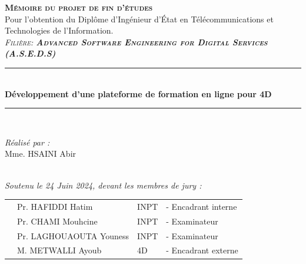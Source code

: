 \vspace{0.5cm}
\begin{center}
{\large \textsc{\textbf{Mémoire du projet de fin d'études}}}\\[0.1cm]
{\large {Pour l’obtention du Diplôme d’Ingénieur d’État en Télécommunications 
et Technologies de l’Information.}}\\[0.1cm]
{\large \textsc{\textit{Filière:\textbf{ Advanced Software Engineering for Digital Services (A.S.E.D.S)}}}} \\[0.05cm] 
\vspace{0.5cm}
\vspace{-0.04cm}
\rule{\linewidth}{0.3mm} \\[0.4cm]   %
 { \huge \textbf{ Développement d’une plateforme de formation en ligne pour 4D }} \\[0.15cm] 
\rule{\linewidth}{0.3mm} \\[0.4cm]



\vspace{1cm}

\noindent
\begin{minipage}{0.9\textwidth}
    \vspace{-7mm}
  \begin{flushleft} \large
    \emph{Réalisé par :}\\
    Mme. \textsc{HSAINI} Abir %
  \end{flushleft}
\end{minipage}
\begin{minipage}{0.4\textwidth}

\end{minipage}\\[0.4cm]

{\large \textit{Soutenu le 24 Juin 2024, devant les membres de jury : }}\\[0.3cm]


\begin{tabular}{p{1cm}lll}
  & \large Pr. HAFIDDI Hatim & \large INPT & \large - Encadrant interne \\[0.1cm]
  & \large Pr. CHAMI Mouhcine & \large INPT & \large - Examinateur  \\[0.1cm]
  & \large Pr. LAGHOUAOUTA Youness & \large INPT & \large - Examinateur \\[0.1cm]
  & \large M. METWALLI Ayoub & \large 4D & \large - Encadrant externe  \\[0.1cm]
\end{tabular}


\end{center}

